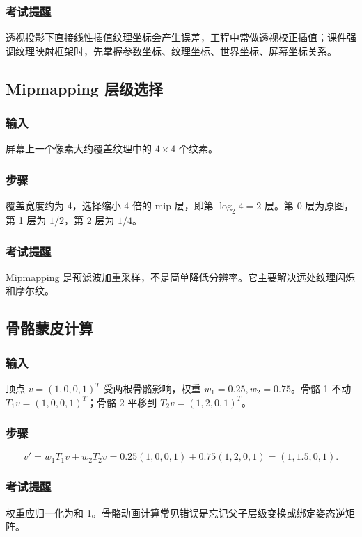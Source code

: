 \documentclass[UTF8,fontset=fandol,11pt]{ctexart}
\begin{document}
\subsubsection*{考试提醒}
透视投影下直接线性插值纹理坐标会产生误差，工程中常做透视校正插值；课件强调纹理映射框架时，先掌握参数坐标、纹理坐标、世界坐标、屏幕坐标关系。

\subsection{Mipmapping 层级选择}
\subsubsection*{输入}
屏幕上一个像素大约覆盖纹理中的 $4\times4$ 个纹素。
\subsubsection*{步骤}
覆盖宽度约为 4，选择缩小 $4$ 倍的 mip 层，即第 $\log_2 4=2$ 层。第 0 层为原图，第 1 层为 $1/2$，第 2 层为 $1/4$。
\subsubsection*{考试提醒}
Mipmapping 是预滤波加重采样，不是简单降低分辨率。它主要解决远处纹理闪烁和摩尔纹。

\subsection{骨骼蒙皮计算}
\subsubsection*{输入}
顶点 $v=(1,0,0,1)^T$ 受两根骨骼影响，权重 $w_1=0.25,w_2=0.75$。骨骼 1 不动 $T_1v=(1,0,0,1)^T$；骨骼 2 平移到 $T_2v=(1,2,0,1)^T$。
\subsubsection*{步骤}
\[
v'=w_1T_1v+w_2T_2v
=0.25(1,0,0,1)+0.75(1,2,0,1)=(1,1.5,0,1).
\]
\subsubsection*{考试提醒}
权重应归一化为和 1。骨骼动画计算常见错误是忘记父子层级变换或绑定姿态逆矩阵。

\newpage
\end{document}
